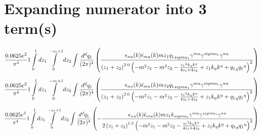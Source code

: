 \section*{Expanding numerator into 3 term(s)}
\begin{dmath}\frac{0.0625 e^{2}}{\pi^{4}}1\int\limits_{ 0 }^{ 1 } d{ z_{ 1 } }\int\limits_{ 0 }^{ - { z_{ 1 } } + 1 } d{ z_{ 2 } }\int\frac{d^d q_1 }{ (2\pi)^4 }\left(\frac{\epsilon_{ \\nu }({ k }) \bar{\epsilon}_{ \\mu }({ k }) m { z_{ 1 } } { { q_1 }_{ \\sigma_1 } } { \gamma^{ \\mu } } { \gamma^{ \\sigma_1 } } { \gamma^{ \\nu } }}{\left({ z_{ 1 } } + { z_{ 2 } }\right)^{2.0} \left(- m^{2} { z_{ 1 } } - m^{2} { z_{ 2 } } - \frac{{ z_{ 1 } }^{2} { { k }_{ \eta } } { { k }^{ \eta } }}{4 { z_{ 1 } } + 4 { z_{ 2 } }} + { z_{ 1 } } { { k }_{ \eta } } { { k }^{ \eta } } + { { q_1 }_{ \eta } } { { q_1 }^{ \eta } }\right)^{2}}\right)\end{dmath}
\begin{dmath}\frac{0.0625 e^{2}}{\pi^{4}}1\int\limits_{ 0 }^{ 1 } d{ z_{ 1 } }\int\limits_{ 0 }^{ - { z_{ 1 } } + 1 } d{ z_{ 2 } }\int\frac{d^d q_1 }{ (2\pi)^4 }\left(\frac{\epsilon_{ \\nu }({ k }) \bar{\epsilon}_{ \\mu }({ k }) m { z_{ 2 } } { { q_1 }_{ \\sigma_1 } } { \gamma^{ \\mu } } { \gamma^{ \\sigma_1 } } { \gamma^{ \\nu } }}{\left({ z_{ 1 } } + { z_{ 2 } }\right)^{2.0} \left(- m^{2} { z_{ 1 } } - m^{2} { z_{ 2 } } - \frac{{ z_{ 1 } }^{2} { { k }_{ \eta } } { { k }^{ \eta } }}{4 { z_{ 1 } } + 4 { z_{ 2 } }} + { z_{ 1 } } { { k }_{ \eta } } { { k }^{ \eta } } + { { q_1 }_{ \eta } } { { q_1 }^{ \eta } }\right)^{2}}\right)\end{dmath}
\begin{dmath}\frac{0.0625 e^{2}}{\pi^{4}}1\int\limits_{ 0 }^{ 1 } d{ z_{ 1 } }\int\limits_{ 0 }^{ - { z_{ 1 } } + 1 } d{ z_{ 2 } }\int\frac{d^d q_1 }{ (2\pi)^4 }\left(- \frac{\epsilon_{ \\nu }({ k }) \bar{\epsilon}_{ \\mu }({ k }) m { z_{ 1 } } { { k }_{ \\sigma_1 } } { \gamma^{ \\mu } } { \gamma^{ \\sigma_1 } } { \gamma^{ \\nu } }}{2 \left({ z_{ 1 } } + { z_{ 2 } }\right)^{1.5} \left(- m^{2} { z_{ 1 } } - m^{2} { z_{ 2 } } - \frac{{ z_{ 1 } }^{2} { { k }_{ \eta } } { { k }^{ \eta } }}{4 { z_{ 1 } } + 4 { z_{ 2 } }} + { z_{ 1 } } { { k }_{ \eta } } { { k }^{ \eta } } + { { q_1 }_{ \eta } } { { q_1 }^{ \eta } }\right)^{2}}\right)\end{dmath}

